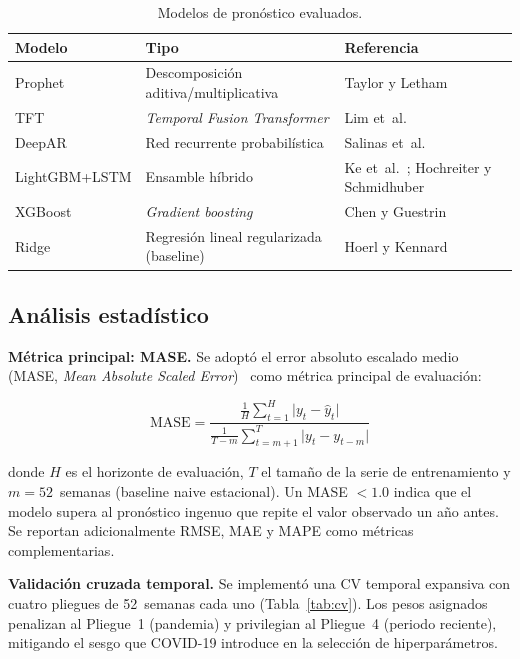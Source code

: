 \documentclass[12pt,a4paper]{article}
\begin{document}
\begin{table}[ht]
\centering
\caption{Modelos de pronóstico evaluados.}
\label{tab:modelos}
\begin{tabular}{@{}llp{6cm}@{}}
\toprule
\textbf{Modelo} & \textbf{Tipo} & \textbf{Referencia} \\
\midrule
Prophet        & Descomposición aditiva/multiplicativa   & Taylor y Letham~\cite{taylor2018} \\
TFT            & \textit{Temporal Fusion Transformer}     & Lim et~al.~\cite{lim2021} \\
DeepAR         & Red recurrente probabilística            & Salinas et~al.~\cite{salinas2020} \\
LightGBM+LSTM  & Ensamble híbrido                        & Ke et~al.~\cite{ke2017}; Hochreiter y Schmidhuber~\cite{hochreiter1997} \\
XGBoost        & \textit{Gradient boosting}               & Chen y Guestrin~\cite{chen2016} \\
Ridge          & Regresión lineal regularizada (baseline) & Hoerl y Kennard~\cite{hoerl1970} \\
\bottomrule
\end{tabular}
\end{table}

\subsection*{Análisis estadístico}

\noindent\textbf{Métrica principal: MASE.}
Se adoptó el error absoluto escalado medio (MASE, \textit{Mean Absolute Scaled Error})~\cite{hyndman2006} como métrica principal de evaluación:

\begin{equation}
\text{MASE} = \frac{\displaystyle\frac{1}{H}\sum_{t=1}^{H}\bigl|y_t - \hat{y}_t\bigr|}{\displaystyle\frac{1}{T-m}\sum_{t=m+1}^{T}\bigl|y_t - y_{t-m}\bigr|}
\label{eq:mase}
\end{equation}

\noindent donde $H$ es el horizonte de evaluación, $T$ el tamaño de la serie de entrenamiento y $m = 52$~semanas (baseline naive estacional). Un MASE $< 1.0$ indica que el modelo supera al pronóstico ingenuo que repite el valor observado un año antes. Se reportan adicionalmente RMSE, MAE y MAPE como métricas complementarias.

\noindent\textbf{Validación cruzada temporal.}
Se implementó una CV temporal expansiva con cuatro pliegues de 52~semanas cada uno (Tabla~\ref{tab:cv}). Los pesos asignados penalizan al Pliegue~1 (pandemia) y privilegian al Pliegue~4 (periodo reciente), mitigando el sesgo que COVID-19 introduce en la selección de hiperparámetros.
\end{document}
